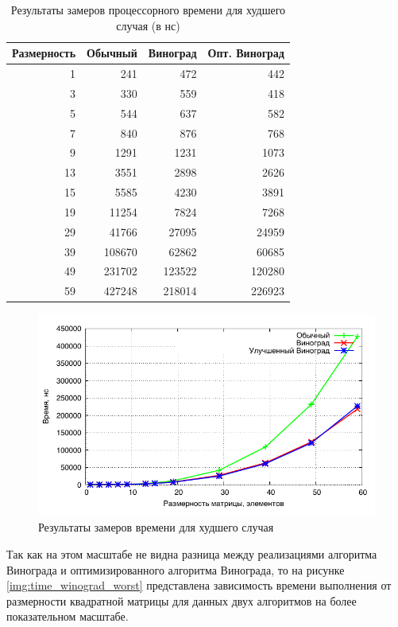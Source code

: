 \begin{table}[h]
  \caption{\label{table:time_worst} Результаты замеров процессорного времени для худшего случая (в нс)}
  \begin{center}
    \begin{tabular}{|r|r|r|r|}
      \hline
      Размерность & Обычный & Виноград & Опт. Виноград\\ \hline
      1 & 241 & 472 & 442 \\ \hline
      3 & 330 & 559 & 418 \\ \hline
      5 & 544 & 637 & 582 \\ \hline
      7 & 840 & 876 & 768 \\ \hline
      9 & 1291 & 1231 & 1073 \\ \hline
      13 & 3551 & 2898 & 2626 \\ \hline
      15 & 5585 & 4230 & 3891 \\ \hline
      19 & 11254 & 7824 & 7268 \\ \hline
      29 & 41766 & 27095 & 24959 \\ \hline
      39 & 108670 & 62862 & 60685 \\ \hline
      49 & 231702 & 123522 & 120280 \\ \hline
      59 & 427248 & 218014 & 226923 \\ \hline
    \end{tabular}
  \end{center}
\end{table}

\newpage

\noindent
\begin{figure}[h!]
	\centering
    \includegraphics[width=0.75\linewidth]{../data/time_worst}
    \caption{Результаты замеров времени для худшего случая}
    \label{img:time_worst}
\end{figure}

Так как на этом масштабе не видна разница между реализациями алгоритма Винограда и оптимизированного алгоритма Винограда, то на рисунке \ref{img:time_winograd_worst} представлена зависимость времени выполнения от размерности квадратной матрицы для данных двух алгоритмов на более показательном масштабе.

